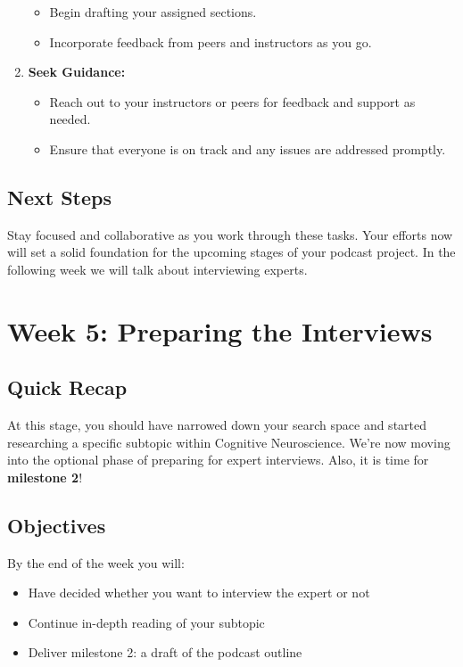 \documentclass[
  letterpaper,
  DIV=11,
  numbers=noendperiod]{scrreprt}
\providecommand{\tightlist}{%
  \setlength{\itemsep}{0pt}\setlength{\parskip}{0pt}}\usepackage{longtable,booktabs,array}
\begin{document}
\begin{enumerate}
  \begin{itemize}
  \tightlist
  \item
    Begin drafting your assigned sections.
  \item
    Incorporate feedback from peers and instructors as you go.
  \end{itemize}
\item
  \textbf{Seek Guidance:}

  \begin{itemize}
  \tightlist
  \item
    Reach out to your instructors or peers for feedback and support as
    needed.
  \item
    Ensure that everyone is on track and any issues are addressed
    promptly.
  \end{itemize}
\end{enumerate}

\section{Next Steps}\label{next-steps-4}

Stay focused and collaborative as you work through these tasks. Your
efforts now will set a solid foundation for the upcoming stages of your
podcast project. In the following week we will talk about interviewing
experts.

\chapter{Week 5: Preparing the
Interviews}\label{week-5-preparing-the-interviews}

\section{Quick Recap}\label{quick-recap}

At this stage, you should have narrowed down your search space and
started researching a specific subtopic within Cognitive Neuroscience.
We're now moving into the optional phase of preparing for expert
interviews. Also, it is time for \textbf{milestone 2}!

\section{Objectives}\label{objectives-4}

By the end of the week you will:

\begin{itemize}
\tightlist
\item
  Have decided whether you want to interview the expert or not
\item
  Continue in-depth reading of your subtopic
\item
  Deliver milestone 2: a draft of the podcast outline
\end{itemize}
\end{document}

